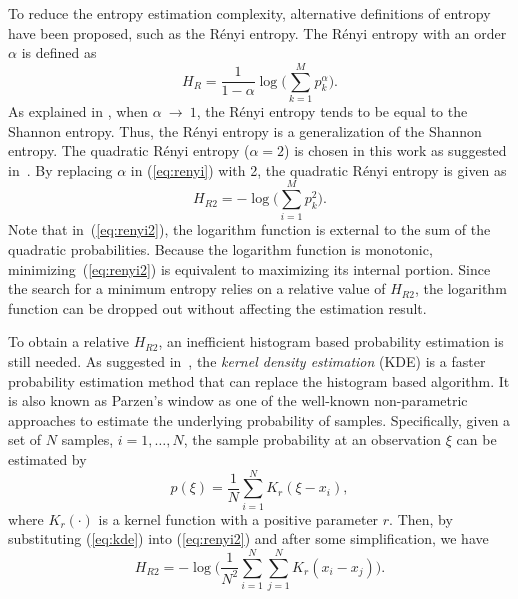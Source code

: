 \documentclass[12pt, draftclsnofoot, onecolumn]{IEEEtran}
\begin{document}
To reduce the entropy estimation complexity, alternative definitions of entropy have been proposed, such as the R\'enyi entropy.
The R\'enyi entropy  with an order \(\alpha\) is defined as \cite{renyi1961measures}
\begin{equation}
H_{R }={\frac {1}{1-\alpha }}\log {\Bigg (}\sum _{k=1}^{M}p_{k}^{\alpha }{\Bigg )}.
\label{eq:renyi}
\end{equation}
As explained in \cite{Bromiley2004}, when $\alpha~\to~1$, the R\'enyi entropy tends to be equal to the Shannon entropy.
Thus, the R\'enyi entropy is a generalization of the Shannon entropy.
The quadratic R\'enyi entropy ($\alpha=2$) is chosen in this work as suggested in~\cite{Santamaria2002}.
By replacing $\alpha$ in (\ref{eq:renyi}) with 2, the quadratic R\'enyi entropy is given as
\begin{equation}
H_{R2 }=-\log {\Bigg (}\sum _{i=1}^{M}p_{k}^{2 }{\Bigg )}.
\label{eq:renyi2}
\end{equation}
Note that in~(\ref{eq:renyi2}), the logarithm function is  external to the sum of the quadratic probabilities.
Because the logarithm function is monotonic, minimizing~(\ref{eq:renyi2}) is equivalent to maximizing its internal portion.
Since the search for a minimum entropy relies on a relative value of \(H_{R2 }\),
the logarithm function can be dropped out without affecting the estimation result.
% 
% 

To obtain a relative \(H_{R2 }\), an inefficient histogram based probability estimation is still needed.
As suggested in~\cite{Principe2000a}, the \textit{kernel density estimation} (KDE) is a faster probability estimation method that can replace the histogram based algorithm.
It is also known as Parzen's window \cite{Parzen1962} as one of the well-known non-parametric approaches to estimate the underlying probability of samples. 
% 
% 
Specifically, given a set of \(N\) samples, \(i=1, \dots, N\), the sample probability at an observation \(\xi\) can be estimated by
\begin{equation}
{ p(\xi)={\frac {1}{N}}\sum _{i=1}^{N}K_{r}\left(\xi-x_i\right)},
\label{eq:kde}
\end{equation}
where $K_r(\cdot)$ is a kernel function with a positive parameter $r$.
Then, by substituting (\ref{eq:kde}) into (\ref{eq:renyi2}) and after some simplification, we have
\begin{equation}
H_{R2 }=-\log {\Bigg (}\frac{1}{N^2}\sum _{i=1}^{N}\sum _{j=1}^{N}K_{r}\left(x_i-x_j\right){\Bigg )}.
\label{eq:ker_ent_est}
\end{equation}
\end{document}
